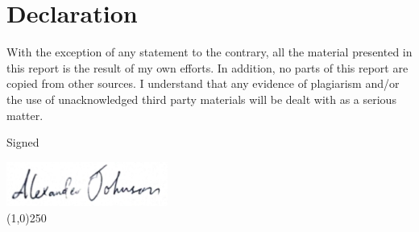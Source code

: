 \chapter*{Declaration}
With the exception of any statement to the contrary, all the material presented in this report is the result of my own efforts. In addition, no parts of this report are copied from other sources. I understand that any evidence of plagiarism and/or the use of unacknowledged third party materials will be dealt with as a serious matter.
\vspace{2cm}

Signed\vspace{-12pt}
\begin{center}
    \includegraphics[width=150pt]{Signiture.jpg}\vspace{-25.6pt}\\
	\line(1,0){250}
\end{center}